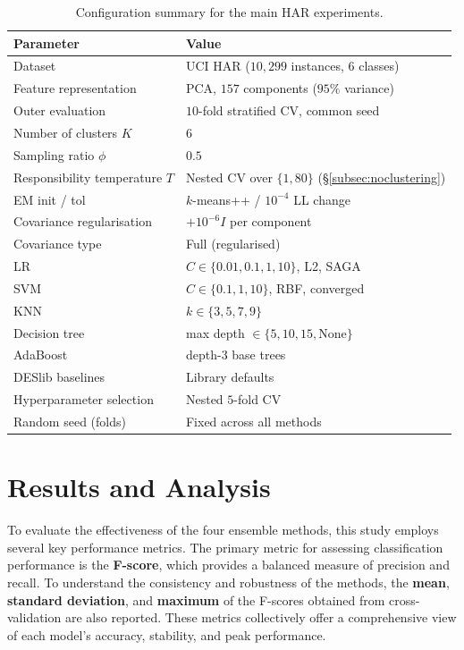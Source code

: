 \documentclass[lettersize,journal]{IEEEtran}
\begin{document}
	\begin{table}[htbp]
		\begin{center}
			\caption{Configuration summary for the main HAR experiments.}
			\label{tab:configuration}
			\setlength{\tabcolsep}{3pt}
			\small
			\begin{tabular}{|>{\raggedright\arraybackslash}p{2.6cm}|>{\raggedright\arraybackslash}p{4.9cm}|}
				\hline
				\textbf{Parameter} & \textbf{Value} \\
				\hline
				Dataset & UCI HAR ($10{,}299$ instances, $6$ classes) \\
				Feature representation & PCA, $157$ components ($95\%$ variance) \\
				Outer evaluation & $10$-fold stratified CV, common seed \\
				Number of clusters $K$ & $6$ \\
				Sampling ratio $\phi$ & $0.5$ \\
				Responsibility temperature $T$ & Nested CV over $\{1,80\}$ (\S\ref{subsec:noclustering}) \\
				EM init / tol & $k$-means++ / $10^{-4}$ LL change \\
				Covariance regularisation & $+10^{-6} I$ per component \\
				Covariance type & Full (regularised) \\
				LR & $C \in \{0.01,0.1,1,10\}$, L2, SAGA \\
				SVM & $C \in \{0.1,1,10\}$, RBF, converged \\
				KNN & $k \in \{3,5,7,9\}$ \\
				Decision tree & max depth $\in \{5,10,15,\text{None}\}$ \\
				AdaBoost & depth-$3$ base trees \\
				DESlib baselines & Library defaults \\
				Hyperparameter selection & Nested $5$-fold CV \\
				Random seed (folds) & Fixed across all methods \\
				\hline
			\end{tabular}
		\end{center}
	\end{table}

	\section{Results and Analysis}\label{sec:results}
	
	\noindent To evaluate the effectiveness of the four ensemble methods, this study employs several key performance metrics. The primary metric for assessing classification performance is the \textbf{F-score}, which provides a balanced measure of precision and recall. To understand the consistency and robustness of the methods, the \textbf{mean}, \textbf{standard deviation}, and \textbf{maximum} of the F-scores obtained from cross-validation are also reported. These metrics collectively offer a comprehensive view of each model's accuracy, stability, and peak performance.
	
\end{document}
